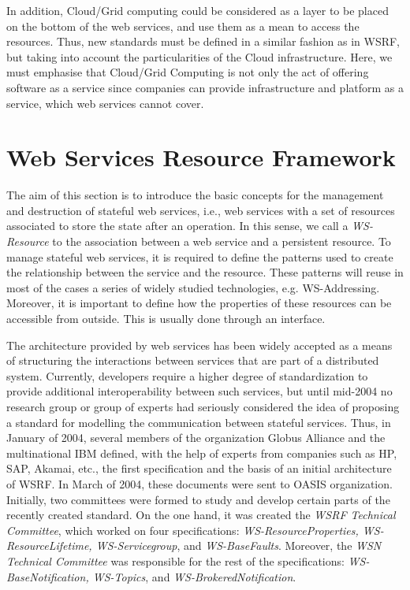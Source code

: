In addition, Cloud/Grid computing could be considered as a layer to be placed on the bottom of the web services, 
and use them as a mean to access the resources. Thus, new standards must be defined in a similar fashion as in
WSRF, but taking into account the particularities of the Cloud infrastructure. Here, we must emphasise that Cloud/Grid 
Computing is not only the act of offering software as a service since companies can provide infrastructure and platform as a service, 
which web services cannot cover. 

\section{Web Services Resource Framework}

The aim of this section is to introduce the basic concepts for the management 
and destruction of stateful web services, i.e., web services with 
a set of resources associated to store the
state after an operation. In this sense, we call a \emph{WS-Resource} 
to the association between a web service and a persistent resource.
To manage stateful web services, it is required to 
define the patterns used to create the relationship between the service and the resource. These patterns
will reuse in most of the cases a series of widely studied technologies, e.g. WS-Addressing. 
Moreover, it is important to define how the properties of these resources can be accessible 
from outside. This is usually done through an interface.

The architecture provided by web services has been widely accepted as a means of 
structuring the interactions between services that are part of a distributed system. 
Currently, developers require a higher 
degree of standardization to provide additional interoperability between such services, 
but until mid-2004 no research group or group of experts had seriously considered the idea of 
proposing a standard for modelling the communication between stateful services.
Thus, in January of 2004, several members of the organization Globus Alliance and the multinational IBM 
defined, with the help of experts from companies such as HP, SAP, Akamai, etc., 
the first specification and the basis of an initial architecture of WSRF. 
In March of 2004, these documents were sent to OASIS organization. Initially, two committees were formed to study and develop 
certain parts of the recently created standard. 
On the one hand, it was created the \emph{WSRF Technical Committee}, which worked on four specifications:
\emph{WS-ResourceProperties, WS-ResourceLifetime, WS-Servicegroup}, 
and \emph{WS-BaseFaults}. Moreover, the \emph{WSN Technical Committee} 
was responsible for the rest of the specifications: \emph{WS-BaseNotification, WS-Topics}, and \emph{WS-BrokeredNotification}.

